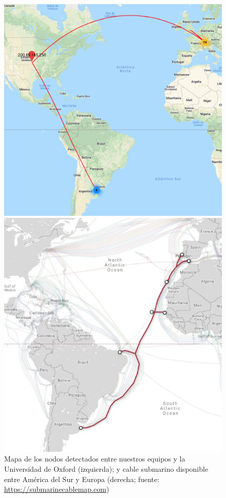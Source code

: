 \begin{figure}[H]
	\begin{minipage}{.5\textwidth}
		\centering
		\includegraphics[width=.8\linewidth]{oxford_mapa.jpg}
	\end{minipage}%
	\begin{minipage}{.5\textwidth}
		\centering
		\includegraphics[width=.8\linewidth]{submarine_cable.jpg}
	\end{minipage}
	\captionsetup{justification=centering}
	\caption{Mapa de los nodos detectados entre nuestros equipos y la Universidad de Oxford (izquierda); y cable submarino disponible entre América del Sur y Europa (derecha; fuente: \url{https://submarinecablemap.com})}
\end{figure}


